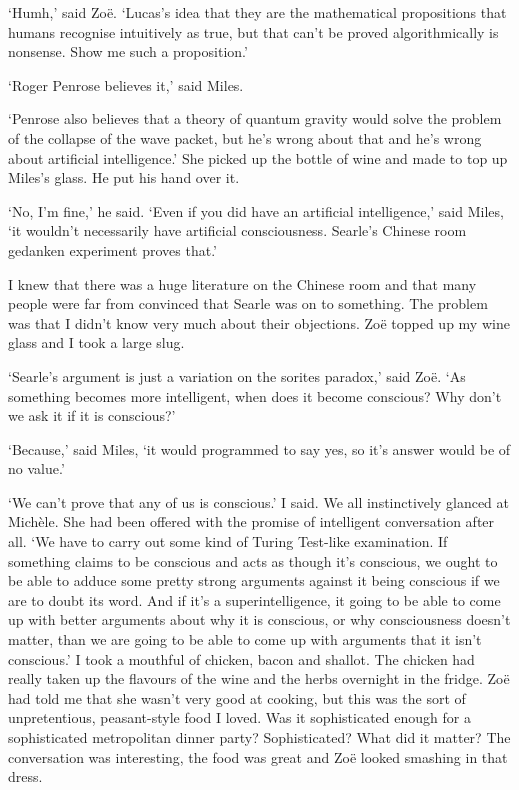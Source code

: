 `Humh,' said Zo{\"e}. `Lucas's idea that they are the mathematical
propositions that humans recognise intuitively as true, but that
can't be proved algorithmically is nonsense. Show me such a
proposition.'

`Roger Penrose believes it,' said Miles.

`Penrose also believes that a theory of quantum gravity would solve
the problem of the collapse of the wave packet, but he's wrong about
that and he's wrong about artificial intelligence.' She picked up
the bottle of wine and made to top up Miles's glass. He put his hand
over it.

`No, I'm fine,' he said. `Even if you did have an artificial
intelligence,' said Miles, `it wouldn't necessarily have artificial
consciousness. Searle's Chinese room gedanken experiment proves
that.'

I knew that there was a huge literature on the Chinese room and that
many people were far from convinced that Searle was on to something.
The problem was that I didn't know very much about their objections.
Zo{\"e} topped up my wine glass and I took a large slug.

`Searle's argument is just a variation on the sorites paradox,' said
Zo{\"e}. `As something becomes more intelligent, when does it become
conscious? Why don't we ask it if it is conscious?'

`Because,' said Miles, `it would programmed to say yes, so it's
answer would be of no value.'

`We can't prove that any of us is conscious.' I said. We all
instinctively glanced at Mich{\`e}le. She had been offered with the
promise of intelligent conversation after all. `We have to carry out
some kind of Turing Test-like examination. If something claims to be
conscious and acts as though it's conscious, we ought to be able to
adduce some pretty strong arguments against it being conscious if we
are to doubt its word. And if it's a superintelligence, it going to
be able to come up with better arguments about why it is conscious,
or why consciousness doesn't matter, than we are going to be able to
come up with arguments that it isn't conscious.' I took a mouthful
of chicken, bacon and shallot. The chicken had really taken up the
flavours of the wine and the herbs overnight in the fridge. Zo{\"e}
had told me that she wasn't very good at cooking, but this was the
sort of unpretentious, peasant-style food I loved. Was it sophisticated
enough for a sophisticated metropolitan dinner party? Sophisticated?
What did it matter? The conversation was {\twelveit interesting},
the food was great and Zo{\"e} looked smashing in that dress.

